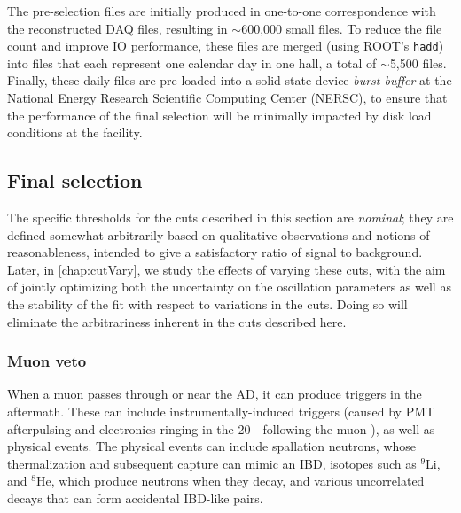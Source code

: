 \documentclass[../thesis.tex]{subfiles}
\begin{document}
The pre-selection files are initially produced in one-to-one correspondence with the reconstructed DAQ files, resulting in $\sim$600,000 small files. To reduce the file count and improve IO performance, these files are merged (using ROOT's \texttt{hadd}) into files that each represent one calendar day in one hall, a total of $\sim$5,500 files. Finally, these daily files are pre-loaded into a solid-state device \emph{burst buffer} at the National Energy Research Scientific Computing Center (NERSC), to ensure that the performance of the final selection will be minimally impacted by disk load conditions at the facility.

\subsection{Final selection}
\label{sec:selFinalSel}

The specific thresholds for the cuts described in this section are \emph{nominal}; they are defined somewhat arbitrarily based on qualitative observations and notions of reasonableness, intended to give a satisfactory ratio of signal to background. Later, in \autoref{chap:cutVary}, we study the effects of varying these cuts, with the aim of jointly optimizing both the uncertainty on the oscillation parameters as well as the stability of the fit with respect to variations in the cuts. Doing so will eliminate the arbitrariness inherent in the cuts described here.

\subsubsection{Muon veto}
\label{sec:selMuonVeto}

When a muon passes through or near the AD, it can produce triggers in the aftermath. These can include instrumentally-induced triggers (caused by PMT afterpulsing and electronics ringing in the 20~\us\ following the muon \cite{Jetter_2012}), as well as physical events. The physical events can include spallation neutrons, whose thermalization and subsequent capture can mimic an IBD, isotopes such as $^9$Li, and $^8$He, which produce neutrons when they decay, and various uncorrelated decays that can form accidental IBD-like pairs.
\end{document}
